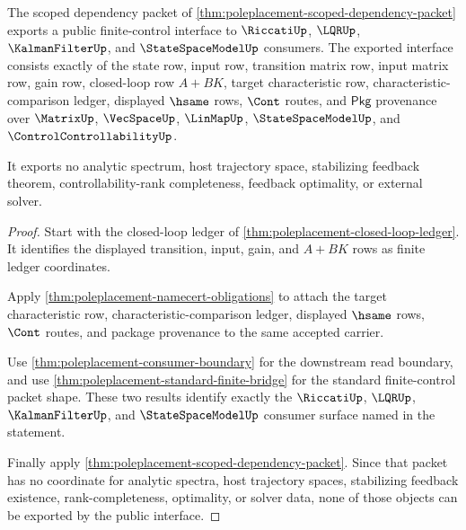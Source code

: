 \begin{theorem}\label{thm:poleplacement-public-consumer-export}
The scoped dependency packet of
\autoref{thm:poleplacement-scoped-dependency-packet} exports a public
finite-control interface to $\RiccatiUp$, $\LQRUp$, $\KalmanFilterUp$, and
$\StateSpaceModelUp$ consumers. The exported interface consists exactly of the
state row, input row, transition matrix row, input matrix row, gain row,
closed-loop row $A+BK$, target characteristic row,
characteristic-comparison ledger, displayed $\hsame$ rows, $\Cont$ routes, and
$\mathsf{Pkg}$ provenance over $\MatrixUp$, $\VecSpaceUp$, $\LinMapUp$,
$\StateSpaceModelUp$, and $\ControlControllabilityUp$.

It exports no analytic spectrum, host trajectory space, stabilizing feedback
theorem, controllability-rank completeness, feedback optimality, or external
solver.
\end{theorem}
\begin{proof}
Start with the closed-loop ledger of
\autoref{thm:poleplacement-closed-loop-ledger}. It identifies the displayed
transition, input, gain, and $A+BK$ rows as finite ledger coordinates.

Apply \autoref{thm:poleplacement-namecert-obligations} to attach the target
characteristic row, characteristic-comparison ledger, displayed $\hsame$ rows,
$\Cont$ routes, and package provenance to the same accepted carrier.

Use \autoref{thm:poleplacement-consumer-boundary} for the downstream read
boundary, and use \autoref{thm:poleplacement-standard-finite-bridge} for the
standard finite-control packet shape. These two results identify exactly the
$\RiccatiUp$, $\LQRUp$, $\KalmanFilterUp$, and $\StateSpaceModelUp$ consumer
surface named in the statement.

Finally apply \autoref{thm:poleplacement-scoped-dependency-packet}. Since that
packet has no coordinate for analytic spectra, host trajectory spaces,
stabilizing feedback existence, rank-completeness, optimality, or solver data,
none of those objects can be exported by the public interface.
\end{proof}


